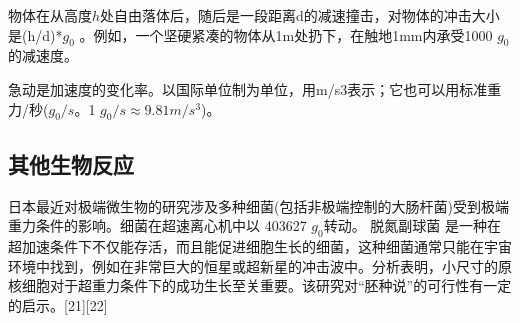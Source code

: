 物体在从高度$h$处自由落体后，随后是一段距离d的减速撞击，对物体的冲击大小是(h/d)*$g_0$ 。例如，一个坚硬紧凑的物体从1m处扔下，在触地1mm内承受1000 $g_0$ 的减速度。

急动是加速度的变化率。以国际单位制为单位，用m/s3表示；它也可以用标准重力/秒($g_0/s$。1 $g_0/s \approx 9.81 m/s^3$)。

\subsection{其他生物反应}
日本最近对极端微生物的研究涉及多种细菌(包括非极端控制的大肠杆菌)受到极端重力条件的影响。细菌在超速离心机中以 403627 $g_0$转动。 脱氮副球菌 是一种在超加速条件下不仅能存活，而且能促进细胞生长的细菌，这种细菌通常只能在宇宙环境中找到，例如在非常巨大的恒星或超新星的冲击波中。分析表明，小尺寸的原核细胞对于超重力条件下的成功生长至关重要。该研究对“胚种说”的可行性有一定的启示。[21][22]

